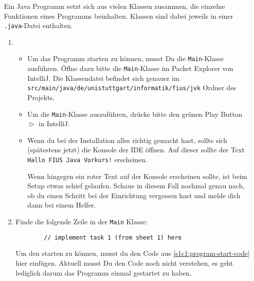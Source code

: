 
\label{ex1}

\begin{Infobox}[Klassendateien]
    Ein Java Programm setzt sich aus vielen Klassen zusammen, die einzelne Funktionen eines Programms beinhalten.
    Klassen sind dabei jeweils in einer \texttt{.java}-Datei enthalten.
\end{Infobox}

\begin{enumerate}
    \item
    \begin{itemize}
        \item
        Um das Programm starten zu können, musst Du die \texttt{Main}-Klasse ausführen.
        Öffne dazu bitte die \texttt{Main}-Klasse im Packet Explorer von IntelliJ.
        Die Klassendatei befindet sich genauer im \texttt{src/main/java/de/unistuttgart/informatik/fius/jvk} Ordner des Projekts.

        \item
        Um die \texttt{Main}-Klasse auszuführen, drücke bitte den grünen Play Button $\vartriangleright$ in IntelliJ.
        \item Wenn du bei der Installation alles richtig gemacht hast, sollte sich (spätestens jetzt) die Konsole der IDE öffnen.
        Auf dieser sollte der Text \texttt{Hallo FIUS Java Vorkurs!} erscheinen.

        Wenn hingegen ein roter Text auf der Konsole erscheinen sollte, ist beim Setup etwas schief gelaufen.
        Schaue in diesem Fall nochmal genau nach, ob du einen Schritt bei der Einrichtung vergessen hast und melde dich dann bei einem Helfer.
    \end{itemize}

    \item
    Finde die folgende Zeile in der \lstinline{Main} Klasse:
    \begin{lstlisting}
        // implement task 1 (from sheet 1) here
    \end{lstlisting}

    Um den \simlator starten zu können, musst du den Code aus \autoref{s1c1:program-start-code} hier einfügen.
    Aktuell musst Du den Code noch nicht verstehen, es geht lediglich darum das Programm einmal gestartet zu haben.


\end{enumerate}
